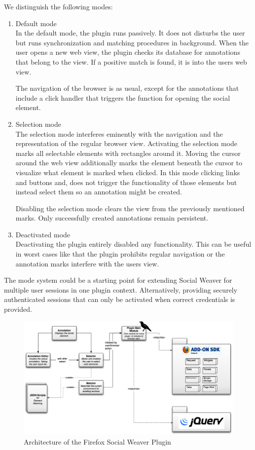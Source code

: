 We distinguish the following modes:
\begin{enumerate}
\item Default mode \\

In the default mode, the plugin runs passively. It does not disturbs the user but runs synchronization and matching procedures in background. When the user opens a new web view, the plugin checks its database for annotations that belong to the view. If a positive match is found, it is into the users web view. 

The navigation of the browser is as usual, except for the annotations that include a click handler that triggers the function for opening the social element.

\item Selection mode \\ 

The selection mode interferes eminently with the navigation and the representation of the regular browser view. Activating the selection mode marks all selectable elements with rectangles around it. Moving the cursor around the web view additionally marks the element beneath the cursor to visualize what element is marked when clicked. 
In this  mode clicking links and buttons and, does not trigger the functionality of those elements but instead select them so an annotation might be created. 

Disabling the selection mode clears the view from the previously mentioned marks. Only successfully created annotations remain persistent. 

\item Deactivated mode \\ 

Deactivating the plugin entirely disabled any functionality. This can be useful in worst cases like that the plugin prohibits regular navigation or the annotation marks interfere with the users view.
\end{enumerate}

The mode system could be a starting point for extending Social Weaver for multiple user sessions in one plugin context. Alternatively, providing securely authenticated sessions that can only be activated when correct credentials is provided. 

\begin{figure}\centering
		\includegraphics[width=13cm]{images/plugin-architecture.png}
		\caption{Architecture of the Firefox Social Weaver Plugin}
		\label{plugin-architecture}
\end{figure} 

